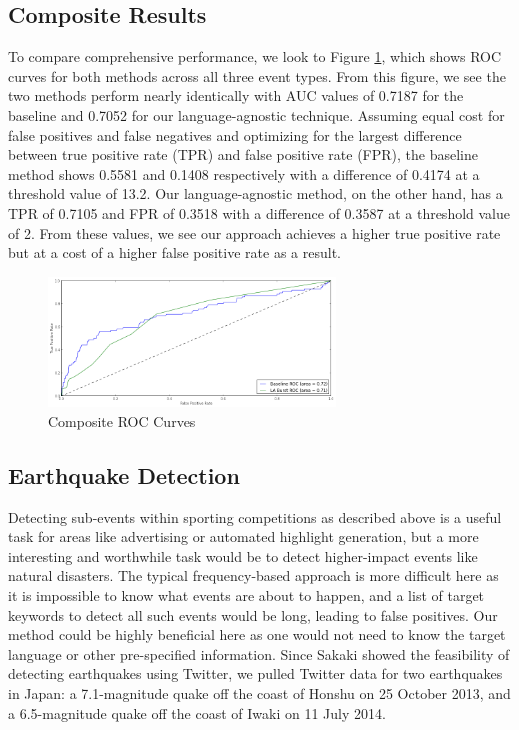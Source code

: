\documentclass{sig-alternate}
\begin{document}
\subsection{Composite Results}

To compare comprehensive performance, we look to Figure \ref{fig:rocComprehensive}, which shows ROC curves for both methods across all three event types.
From this figure, we see the two methods perform nearly identically with AUC values of 0.7187 for the baseline and 0.7052 for our language-agnostic technique.
Assuming equal cost for false positives and false negatives and optimizing for the largest difference between true positive rate (TPR) and false positive rate (FPR), the baseline method shows 0.5581 and 0.1408 respectively with a difference of 0.4174 at a threshold value of 13.2.
Our language-agnostic method, on the other hand, has a TPR of 0.7105 and FPR of 0.3518 with a difference of 0.3587 at a threshold value of 2.
From these values, we see our approach achieves a higher true positive rate but at a cost of a higher false positive rate as a result.

\begin{figure}[hbtp]
\begin{center}
\includegraphics[width=3in]{./figures/roc_Comp.png}
\caption{Composite ROC Curves}
\label{fig:rocComprehensive}
\end{center}
\end{figure}

\subsection{Earthquake Detection}

Detecting sub-events within sporting competitions as described above is a useful task for areas like advertising or automated highlight generation, but a more interesting and worthwhile task would be to detect higher-impact events like natural disasters.
The typical frequency-based approach is more difficult here as it is impossible to know what events are about to happen, and a list of target keywords to detect all such events would be long, leading to false positives.
Our method could be highly beneficial here as one would not need to know the target language or other pre-specified information.
Since Sakaki showed the feasibility of detecting earthquakes using Twitter, we pulled Twitter data for two earthquakes in Japan: a 7.1-magnitude quake off the coast of Honshu on 25 October 2013, and a 6.5-magnitude quake off the coast of Iwaki on 11 July 2014.
\end{document}
